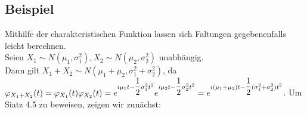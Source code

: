 \documentclass[german,10pt,oneside, fleqn, a4paper]{article}
\newcommand{\1}[1]{1_{#1}}
\newcommand{\2}[1]{\1{\brac{#1}}}
\begin{document}
\subsection{Beispiel}
\label{4.6}
Mithilfe der charakteristischen Funktion lassen sich Faltungen gegebenenfalls leicht berechnen.\\
Seien $X_1\sim N(\mu_1,\sigma_1^2), X_2\sim N(\mu_2,\sigma_2^2)$ unabhängig. \\
Dann gilt $X_1+X_2\sim N(\mu_1+\mu_2,\sigma_1^2+\sigma_2^2)$, da \\
$\varphi_{X_1+X_2}(t)=\varphi_{X_1}(t)\varphi_{X_2}(t)=e^{i\mu_1t-\dfrac{1}{2}\sigma_1^2t^2}e^{i\mu_2t-\dfrac{1}{2}\sigma_2^2t^2}\\
=e^{i(\mu_1+\mu_2)t-\dfrac{1}{2}(\sigma_1^2+\sigma_2^2)t^2}$.
Um Siatz 4.5 zu beweisen, zeigen wir zunächst:
\end{document}
